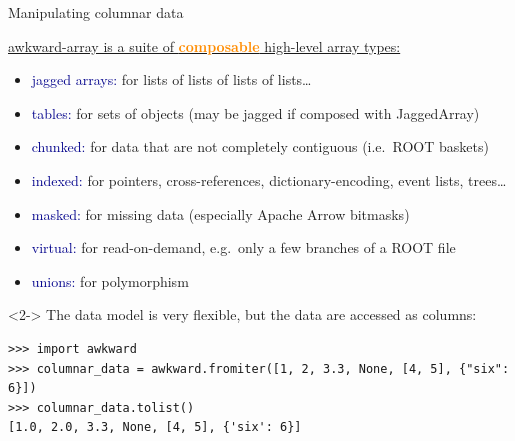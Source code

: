 \documentclass[aspectratio=169]{beamer}
\begin{document}
\begin{frame}[fragile]{Manipulating columnar data}
\vspace{0.5 cm}

\underline{awkward-array is a suite of \textcolor{darkorange}{\bf composable} high-level array types:}

\vspace{0.2 cm}
\begin{itemize}
\item \textcolor{darkblue}{jagged arrays:} for lists of lists of lists of lists\ldots
\item \textcolor{darkblue}{tables:} for sets of objects (may be jagged if composed with JaggedArray)
\item \textcolor{darkblue}{chunked:} for data that are not completely contiguous (i.e.\ ROOT baskets)
\item \textcolor{darkblue}{indexed:} for pointers, cross-references, dictionary-encoding, event lists, trees\ldots
\item \textcolor{darkblue}{masked:} for missing data (especially Apache Arrow bitmasks)
\item \textcolor{darkblue}{virtual:} for read-on-demand, e.g.\ only a few branches of a ROOT file
\item \textcolor{darkblue}{unions:} for polymorphism
\end{itemize}

\vspace{0.5 cm}
\begin{uncoverenv}<2->
The data model is very flexible, but the data are accessed as columns:

\scriptsize
\begin{verbatim}
>>> import awkward
>>> columnar_data = awkward.fromiter([1, 2, 3.3, None, [4, 5], {"six": 6}])
>>> columnar_data.tolist()
[1.0, 2.0, 3.3, None, [4, 5], {'six': 6}]
\end{verbatim}
\end{uncoverenv}
\end{frame}
\end{document}

